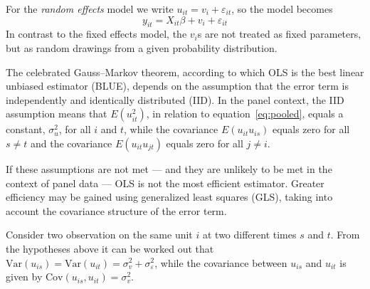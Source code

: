 For the \textsl{random effects} model we write $u_{it} = v_i +
\varepsilon_{it}$, so the model becomes
\begin{equation}
\label{eq:RE}
y_{it} = X_{it}\beta + v_i + \varepsilon_{it}
\end{equation}
In contrast to the fixed effects model, the $v_i$s are not treated as
fixed parameters, but as random drawings from a given probability
distribution.

The celebrated Gauss--Markov theorem, according to which OLS is the
best linear unbiased estimator (BLUE), depends on the assumption that
the error term is independently and identically distributed (IID).  In
the panel context, the IID assumption means that $E(u_{it}^2)$, in
relation to equation~\ref{eq:pooled}, equals a constant, $\sigma^2_u$,
for all $i$ and $t$, while the covariance $E(u_{it} u_{is})$ equals
zero for all $s \neq t$ and the covariance $E(u_{it} u_{jt})$ equals
zero for all $j \neq i$.

If these assumptions are not met --- and they are unlikely to be met
in the context of panel data --- OLS is not the most efficient
estimator.  Greater efficiency may be gained using generalized least
squares (GLS), taking into account the covariance structure of the
error term.  

Consider two observation on the same unit $i$ at two different times
$s$ and $t$. From the hypotheses above it can be worked out that
$\mbox{Var}(u_{is}) = \mbox{Var}(u_{it}) = \sigma^2_{v} +
\sigma^2_{\varepsilon}$, while the covariance between $u_{is}$ and
$u_{it}$ is given by $\mbox{Cov}(u_{is},u_{it}) = \sigma^2_{v}$.

